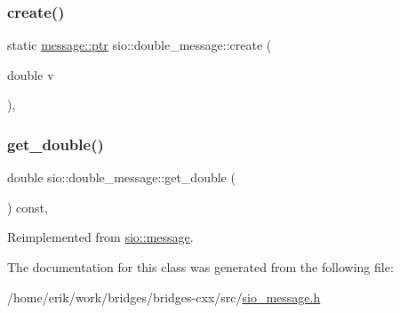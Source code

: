 \subsubsection{\texorpdfstring{create()}{create()}}
{\footnotesize\ttfamily static \hyperlink{classsio_1_1message_a6340b6fef57e4516eb17928b1885a615}{message\+::ptr} sio\+::double\+\_\+message\+::create (\begin{DoxyParamCaption}\item[{double}]{v }\end{DoxyParamCaption})\hspace{0.3cm}{\ttfamily [inline]}, {\ttfamily [static]}}

\mbox{\label{classsio_1_1double__message_a0ab6e4c4e579356b367bb0ef37e79c62}} 
\subsubsection{\texorpdfstring{get\+\_\+double()}{get\_double()}}
{\footnotesize\ttfamily double sio\+::double\+\_\+message\+::get\+\_\+double (\begin{DoxyParamCaption}{ }\end{DoxyParamCaption}) const\hspace{0.3cm}{\ttfamily [inline]}, {\ttfamily [virtual]}}



Reimplemented from \hyperlink{classsio_1_1message_aa89963cd233b29653df1ce1943f9ea57}{sio\+::message}.



The documentation for this class was generated from the following file\+:\begin{DoxyCompactItemize}
\item 
/home/erik/work/bridges/bridges-\/cxx/src/\hyperlink{sio__message_8h}{sio\+\_\+message.\+h}\end{DoxyCompactItemize}
